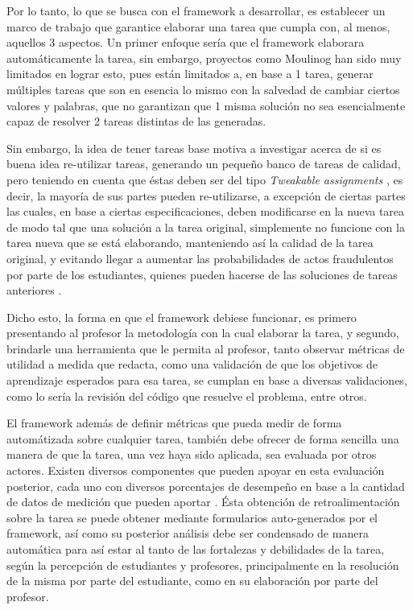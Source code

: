 \documentclass[conference]{IEEEtran}
\begin{document}
Por lo tanto, lo que se busca con el framework a desarrollar, es establecer un marco de trabajo que garantice elaborar una tarea que cumpla con, al menos, aquellos 3 aspectos. Un primer enfoque sería que el framework elaborara automáticamente la tarea, sin embargo, proyectos como Moulinog \cite{10.1145/3414080.3414100} han sido muy limitados en lograr esto, pues están limitados a, en base a 1 tarea, generar múltiples tareas que son en esencia lo mismo con la salvedad de cambiar ciertos valores y palabras, que no garantizan que 1 misma solución no sea esencialmente capaz de resolver 2 tareas distintas de las generadas.

Sin embargo, la idea de tener tareas base motiva a investigar acerca de si es buena idea re-utilizar tareas, generando un pequeño banco de tareas de calidad, pero teniendo en cuenta que éstas deben ser del tipo \textit{Tweakable assignments} \cite{10.1145/3477429}, es decir, la mayoría de sus partes pueden re-utilizarse, a excepción de ciertas partes las cuales, en base a ciertas especificaciones, deben modificarse en la nueva tarea de modo tal que una solución a la tarea original, simplemente no funcione con la tarea nueva que se está elaborando, manteniendo así la calidad de la tarea original, y evitando llegar a aumentar las probabilidades de actos fraudulentos por parte de los estudiantes, quienes pueden hacerse de las soluciones de tareas anteriores \cite{10.1145/3013499.3013507}.

Dicho esto, la forma en que el framework debiese funcionar, es primero presentando al profesor la metodología con la cual elaborar la tarea, y segundo, brindarle una herramienta que le permita al profesor, tanto observar métricas de utilidad a medida que redacta, como una validación de que los objetivos de aprendizaje esperados para esa tarea, se cumplan en base a diversas validaciones, como lo sería la revisión del código que resuelve el problema, entre otros. 

El framework además de definir métricas que pueda medir de forma automátizada sobre cualquier tarea, también debe ofrecer de forma sencilla una manera de que la tarea, una vez haya sido aplicada, sea evaluada por otros actores. Existen diversos componentes que pueden apoyar en esta evaluación posterior, cada uno con diversos porcentajes de desempeño en base a la cantidad de datos de medición que pueden aportar \cite{NAP12636}. Ésta obtención de retroalimentación sobre la tarea se puede obtener mediante formularios auto-generados por el framework, así como su posterior análisis debe ser condensado de manera automática para así estar al tanto de las fortalezas y debilidades de la tarea, según la percepción de estudiantes y profesores, principalmente en la resolución de la misma por parte del estudiante, como en su elaboración por parte del profesor.
\end{document}
